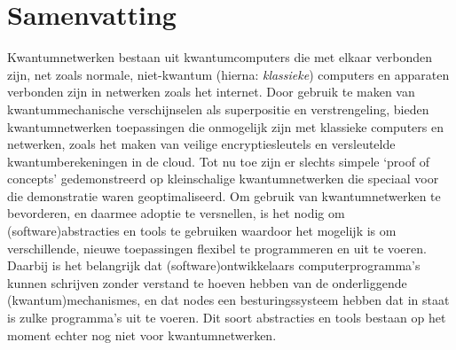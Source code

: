 \chapter*{Samenvatting}

{

Kwantumnetwerken bestaan uit kwantumcomputers die met elkaar verbonden zijn, net zoals normale, niet-kwantum (hierna: \emph{klassieke}) computers en apparaten verbonden zijn in netwerken zoals het internet.
Door gebruik te maken van kwantummechanische verschijnselen als superpositie en verstrengeling, bieden kwantumnetwerken toepassingen die onmogelijk zijn met klassieke computers en netwerken, zoals het maken van veilige encryptiesleutels en versleutelde kwantumberekeningen in de cloud.
Tot nu toe zijn er slechts simpele `proof of concepts' gedemonstreerd op kleinschalige kwantumnetwerken die speciaal voor die demonstratie waren geoptimaliseerd.
Om gebruik van kwantumnetwerken te bevorderen, en daarmee adoptie te versnellen, is het nodig om (software)abstracties en tools te gebruiken waardoor het mogelijk is om verschillende, nieuwe toepassingen flexibel te programmeren en uit te voeren.
Daarbij is het belangrijk dat (software)ontwikkelaars computerprogramma's kunnen schrijven zonder verstand te hoeven hebben van de onderliggende (kwantum)mechanismes, en dat nodes een besturingssysteem hebben dat in staat is zulke programma's uit te voeren.
Dit soort abstracties en tools bestaan op het moment echter nog niet voor kwantumnetwerken.

}
